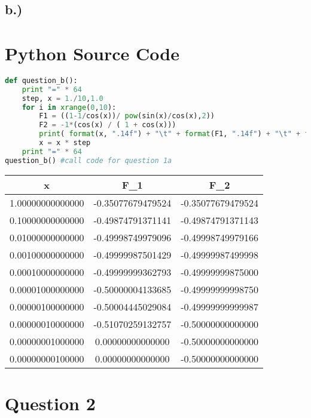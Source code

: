 \documentclass{article}
\begin{document}
\subsection*{b.)}
\section*{Python Source Code }
\begin{lstlisting}[language=Python]
def question_b():
    print "=" * 64
    step, x = 1./10,1.0
    for i in xrange(0,10):
        F1 = ((1-1/cos(x))/ pow(sin(x)/cos(x),2))
        F2 = -1*(cos(x) / ( 1 + cos(x)))
        print( format(x, ".14f") + "\t" + format(F1, ".14f") + "\t" + format(F2, ".14f"))
        x = x * step
    print "=" * 64
question_b() #call code for question 1a
\end{lstlisting}

\begin{center}
    \begin{tabular}{||c c c||} 
    \hline
    x & F_1 & F_2 \\ [0.5ex] 
    \hline\hline
    1.00000000000000 & -0.35077679479524 & -0.35077679479524 \\ [1ex] 
    \hline
    0.10000000000000 & -0.49874791371141 & -0.49874791371143\\ [1ex] 
    \hline
    0.01000000000000 & -0.49998749979096 &  -0.49998749979166\\ [1ex] 
    \hline
    0.00100000000000 & -0.49999987501429 &  -0.49999987499998\\ [1ex] 
    \hline
    0.00010000000000 & -0.49999999362793 &  -0.49999999875000\\ [1ex] 
    \hline
    0.00001000000000 & -0.50000004133685 &  -0.49999999998750\\ [1ex] 
    \hline
    0.00000100000000 & -0.50004445029084 & -0.49999999999987 \\ [1ex] 
    \hline
    0.00000010000000 & -0.51070259132757 & -0.50000000000000 \\ [1ex] 
    \hline
    0.00000001000000 & 0.00000000000000 & -0.50000000000000 \\ [1ex] 
    \hline
    0.00000000100000 & 0.00000000000000 & -0.50000000000000 \\ [1ex] 
    \hline
    \end{tabular}
\end{center}
\section*{Question 2}
\end{document}
